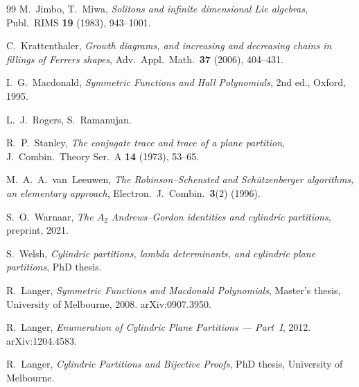 \documentclass[11pt]{report}
\theoremstyle{plain}
\theoremstyle{definition}
\begin{document}
\begin{thebibliography}{99}
  M.~Jimbo, T.~Miwa,
  \emph{Solitons and infinite dimensional Lie algebras},
  Publ.\ RIMS \textbf{19} (1983), 943--1001.

  C.~Krattenthaler,
  \emph{Growth diagrams, and increasing and decreasing
  chains in fillings of Ferrers shapes},
  Adv.\ Appl.\ Math.\ \textbf{37} (2006), 404--431.

  I.~G.~Macdonald,
  \emph{Symmetric Functions and Hall Polynomials},
  2nd ed., Oxford, 1995.

  L.~J.~Rogers, S.~Ramanujan.

  R.~P.~Stanley,
  \emph{The conjugate trace and trace of a plane partition},
  J.~Combin.\ Theory Ser.~A \textbf{14} (1973), 53--65.

  M.~A.~A.~van~Leeuwen,
  \emph{The Robinson--Schensted and Sch\"utzenberger
  algorithms, an elementary approach},
  Electron.\ J.\ Combin.\ \textbf{3}(2) (1996).

  S.~O.~Warnaar,
  \emph{The $A_2$ Andrews--Gordon identities and cylindric
  partitions},
  preprint, 2021.

  S.~Welsh,
  \emph{Cylindric partitions, lambda determinants, and
  cylindric plane partitions},
  PhD thesis.


  R.~Langer,
  \emph{Symmetric Functions and Macdonald Polynomials},
  Master's thesis, University of Melbourne, 2008.
  arXiv:0907.3950.

  R.~Langer,
  \emph{Enumeration of Cylindric Plane Partitions ---
  Part~I},
  2012.  arXiv:1204.4583.

  R.~Langer,
  \emph{Cylindric Partitions and Bijective Proofs},
  PhD thesis, University of Melbourne.

\end{thebibliography}
\end{document}
